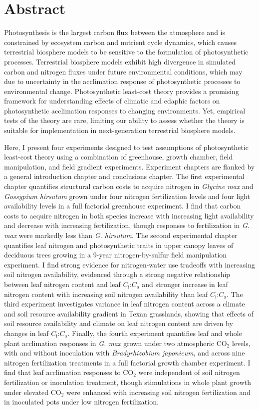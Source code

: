 \documentclass{ttuthes2007}
\begin{document}
\chapter{\textbf{Abstract}}
Photosynthesis is the largest carbon flux between the atmosphere and is constrained by ecosystem carbon and nutrient cycle dynamics, which causes terrestrial biosphere models to be sensitive to the formulation of photosynthetic processes. Terrestrial biosphere models exhibit high divergence in simulated carbon and nitrogen fluxes under future environmental conditions, which may due to uncertainty in the acclimation response of photosynthetic processes to environmental change. Photosynthetic least-cost theory provides a promising framework for understanding effects of climatic and edaphic factors on photosynthetic acclimation responses to changing environments. Yet, empirical tests of the theory are rare, limiting our ability to assess whether the theory is suitable for implementation in next-generation terrestrial biosphere models.

Here, I present four experiments designed to test assumptions of photosynthetic least-cost theory using a combination of greenhouse, growth chamber, field manipulation, and field gradient experiments. Experiment chapters are flanked by a general introduction chapter and conclusions chapter. The first experimental chapter quantifies structural carbon costs to acquire nitrogen in \textit{Glycine max} and \textit{Gossypium hirsutum} grown under four nitrogen fertilization levels and four light availability levels in a full factorial greenhouse experiment. I find that carbon costs to acquire nitrogen in both species increase with increasing light availability and decrease with increasing fertilization, though responses to fertilization in \textit{G. max} were markedly less than \textit{G. hirsutum}. The second experimental chapter quantifies leaf nitrogen and photosynthetic traits in upper canopy leaves of deciduous trees growing in a 9-year nitrogen-by-sulfur field manipulation experiment. I find strong evidence for nitrogen-water use tradeoffs with increasing soil nitrogen availability, evidenced through a strong negative relationship between leaf nitrogen content and leaf $C_\mathrm{i}$:$C_\mathrm{a}$ and stronger increase in leaf nitrogen content with increasing soil nitrogen availability than leaf $C_\mathrm{i}$:$C_\mathrm{a}$. The third experiment investigates variance in leaf nitrogen content across a climate and soil resource availability gradient in Texan grasslands, showing that effects of soil resource availability and climate on leaf nitrogen content are driven by changes in leaf $C_\mathrm{i}$:$C_\mathrm{a}$. Finally, the fourth experiment quantifies leaf and whole plant acclimation responses in \textit{G. max} grown under two atmospheric CO$_2$ levels, with and without inoculation with \textit{Bradyrhizobium japonicum}, and across nine nitrogen fertilization treatments in a full factorial growth chamber experiment. I find that leaf acclimation responses to CO$_2$ were independent of soil nitrogen fertilization or inoculation treatment, though stimulations in whole plant growth under elevated CO$_2$ were enhanced with increasing soil nitrogen fertilization and in inoculated pots under low nitrogen fertilization. 
\end{document}
